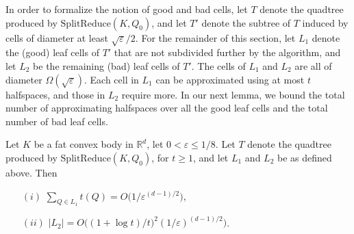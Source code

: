\documentclass[11pt]{article}   \usepackage[letterpaper,hmargin=2.1cm,vmargin=3cm]{geometry}
\newcommand{\RE}{\mathbb{R}}    \newcommand{\ZZ}{\mathbb{Z}}    \newcommand{\eps}{\varepsilon}  \newcommand{\ST}{\,:\,}         \newcommand{\sq}{\square}
\newcommand{\alg}{\textrm{SplitReduce}}
\begin{document}
In order to formalize the notion of good and bad cells, let $T$ denote the quadtree produced by $ \alg(K,Q_0)$, and let $T'$ denote the subtree of $T$ induced by cells of diameter at least $\sqrt{\eps}/2$. For the remainder of this section, let $L_1$ denote the (good) leaf cells of $T'$ that are not subdivided further by the algorithm, and let $L_2$ be the remaining (bad) leaf cells of $T'$. The cells of $L_1$ and $L_2$ are all of diameter $\Omega(\sqrt{\eps})$. Each cell in $L_1$ can be approximated using at most $t$ halfspaces, and those in $L_2$ require more. In our next lemma, we bound the total number of approximating halfspaces over all the good leaf cells and the total number of bad leaf cells. 

\begin{lemma} \label{lem:aux2}
Let $K$ be a fat convex body in $\RE^d$, let $0 < \eps \le 1/8$. Let $T$ denote the quadtree produced by $\alg(K,Q_0)$, for $t \ge 1$, and let $L_1$ and $L_2$ be as defined above. Then 
\begin{enumerate}
\item[$(i)$] $\sum_{Q  \in L_1} t(Q)  = O\big( 1/\eps^{(d-1)/2} \big)$,

\item[$(ii)$] $|L_2| = O\big( (1 + \log t) / t)^2 (1/\eps)^{(d-1)/2} \big)$.
\end{enumerate}
\end{lemma}
\end{document}
